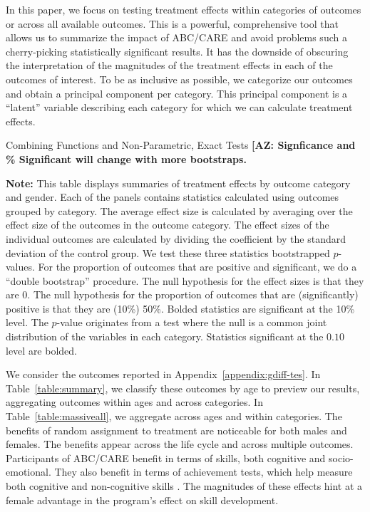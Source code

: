 In this paper, we focus on testing treatment effects within categories of outcomes or across all available outcomes. This is a powerful, comprehensive tool that allows us to summarize the impact of ABC/CARE and avoid problems such a cherry-picking statistically significant results. It has the downside of obscuring the interpretation of the magnitudes of the treatment effects in each of the outcomes of interest. To be as inclusive as possible, we categorize our outcomes and obtain a principal component per category. This principal component is a ``latent'' variable describing each category for which we can calculate treatment effects.

\begin{table}[!htpb]
\begin{threeparttable}
\caption{Combining Functions and Non-Parametric, Exact Tests \textbf{[AZ: Signficance and \% Significant will change with more bootstraps.}} \label{table:massiveall}
\centering
 
\begin{tablenotes}
\footnotesize
\item \textbf{Note:} This table displays summaries of treatment effects by outcome category and gender. Each of the panels contains statistics calculated using outcomes grouped by category. The average effect size is calculated by averaging over the effect size of the outcomes in the outcome category. The effect sizes of the individual outcomes are calculated by dividing the coefficient by the standard deviation of the control group. We test these three statistics bootstrapped $p$-values. For the proportion of outcomes that are positive and significant, we do a ``double bootstrap'' procedure. The null hypothesis for the effect sizes is that they are 0. The null hypothesis for the proportion of outcomes that are (significantly) positive is that they are (10\%) 50\%. Bolded statistics are significant at the 10\% level. The \citet{Rosenbaum_2005_Distribution_JRSS} $p$-value originates from a test where the null is a common joint distribution of the variables in each category. Statistics significant at the $0.10$ level are bolded.
\end{tablenotes}
\end{threeparttable}
\end{table}

We consider the outcomes reported in Appendix~\ref{appendix:gdiff-tes}. In Table~\ref{table:summary}, we classify these outcomes by age to preview our results, aggregating outcomes within ages and across categories. In Table~\ref{table:massiveall}, we aggregate across ages and within categories. The benefits of random assignment to treatment are noticeable for both males and females. The benefits appear across the life cycle and across multiple outcomes. Participants of ABC/CARE benefit in terms of skills, both cognitive and socio-emotional. They also benefit in terms of achievement tests, which help measure both cognitive and non-cognitive skills \citep{Almlund_Duckworth_etal_2011_ecoval}. The magnitudes of these effects hint at a female advantage in the program's effect on skill development.

